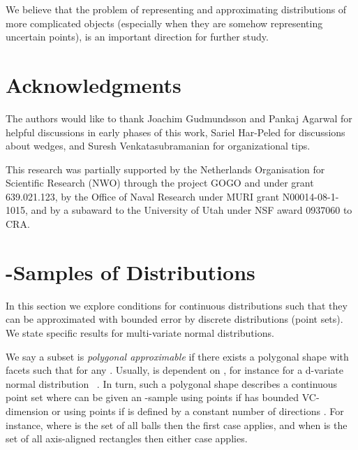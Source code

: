 \documentclass{journal}
\begin{document}
We believe that the problem of representing and approximating distributions of more complicated objects (especially when they are somehow representing uncertain points), is an important direction for further study.  










\section*{Acknowledgments}
The authors would like to thank Joachim Gudmundsson and Pankaj Agarwal for helpful discussions in early phases of this work, Sariel Har-Peled for discussions about wedges, and Suresh Venkatasubramanian for organizational tips.  

This research was partially supported by the Netherlands Organisation for
Scientific Research (NWO) through the project GOGO and under grant 639.021.123,
by the Office of Naval Research under MURI grant N00014-08-1-1015,
and by a subaward to the University of Utah under NSF award 0937060 to CRA.

\newpage














\newpage
\appendix



\section{-Samples of Distributions}
\label{sec:eps-dist}
In this section we explore conditions for continuous distributions such that they can be approximated with bounded error by discrete distributions (point sets).  We state specific results for multi-variate normal distributions.  

We say a subset  is \emph{polygonal approximable} if there exists a polygonal shape  with  facets such that  for any .  Usually,  is dependent on , for instance for a d-variate normal distribution ~\cite{Phi08,Phi09}.  In turn, such a polygonal shape  describes a continuous point set where  can be given an -sample  using  points if  has bounded VC-dimension \cite{Mat99} or using  points if  is defined by a constant  number of directions \cite{Phi08}.  For instance, where  is the set of all balls then the first case applies, and when  is the set of all axis-aligned rectangles then either case applies.
\end{document}
